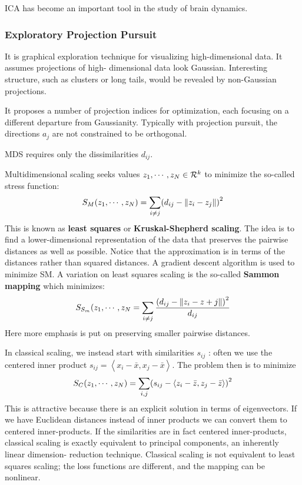 \documentclass[12pt, letterpaper]{article}
\theoremstyle{definition}
\DeclarePairedDelimiter\autobracket{(}{)}
\newcommand{\br}[1]{\autobracket*{#1}}
\begin{document}
ICA has become an important tool in the study of brain dynamics.

\subsubsection{Exploratory Projection Pursuit}
It is graphical exploration technique for visualizing high-dimensional data. It assumes projections of high- dimensional data look Gaussian. Interesting structure, such as clusters or long tails, would be revealed by non-Gaussian projections.

It proposes a number of projection indices for optimization, each focusing on a different departure from Gaussianity. Typically with projection pursuit, the directions $a_j$ are not constrained to be orthogonal.

MDS requires only the dissimilarities $d_{ij}$.

Multidimensional scaling seeks values $z_1, \cdots , z_N \in \CMcal{R}^k$ to minimize the so-called stress function:
\begin{equation}
S_M(z_1, \cdots, z_N) = \sum_{i\ne j}\br{d_{ij}- \| z_i - z_j \|}^2
\end{equation}
This is known as \textbf{least squares} or \textbf{Kruskal-Shepherd scaling}. The idea is to find a lower-dimensional representation of the data that preserves the pairwise distances as well as possible. Notice that the approximation is in terms of the distances rather than squared distances. A gradient descent algorithm is used to minimize SM.
A variation on least squares scaling is the so-called \textbf{Sammon mapping} which minimizes:
\begin{equation}
S_{S_m}(z_1, \cdots, z_N = \sum_{i\ne j}\frac{\br{d_{ij} - \|z_i - z+j\|}^2}{d_{ij}}
\end{equation}
Here more emphasis is put on preserving smaller pairwise distances.

In classical scaling, we instead start with similarities $s_{ij}$ : often we use the centered inner product $s_{ij} = \left\langle x_i - \bar{x} , x_j - \bar{x}\right\rangle$. The problem then is to minimize
\begin{equation}
S_C(z_1, \cdots, z_N) = \sum_{i,j} \br{s_{ij} - \left\langle z_i-\bar{z}, z_j - \bar{z}\right\rangle}^2
\end{equation}
This is attractive because there is an explicit solution in terms of eigenvectors. If we have Euclidean distances instead of inner products we can convert them to centered inner-products. If the similarities are in fact centered inner-products, classical scaling is exactly equivalent to principal components, an inherently linear dimension- reduction technique. Classical scaling is not equivalent to least squares scaling; the loss functions are different, and the mapping can be nonlinear.
\end{document}

